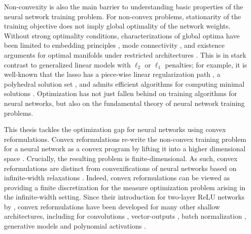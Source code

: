 Non-convexity is also the main barrier to understanding basic properties of the
neural network training problem.
For non-convex problems, stationarity of the training objective does not imply
global optimality of the network weights.
Without strong optimality conditions, characterizations of global optima have
been limited to embedding principles
\citep{fukumizu2000plateau, zhang2021embedding}, mode connectivity
\citep{garipov2018mode, draxler2018barriers}, and existence
arguments for optimal manifolds under restricted architectures
\citep{cooper2021global}.
This is in stark contrast to generalized linear models with \( \ell_2 \)
or \( \ell_1 \) penalties;
for example, it is well-known that the lasso \citep{tibshirani1996regression}
has a piece-wise linear regularization path \citep{osborne2000new, efron2004least},
a polyhedral solution set \citep{tibshirani2013unique}, and
admits efficient algorithms for computing
minimal solutions \citep{tibshirani2013unique}.
Optimization has not just fallen behind on training algorithms for neural
networks, but also on the fundamental theory of neural network training
problems.

This thesis tackles the optimization gap for neural networks using convex
reformulations.
Convex reformulations re-write the non-convex training problem for a neural
network as a convex program by lifting it into a higher dimensional space
\citep{pilanci2020convexnn}.
Crucially, the resulting problem is finite-dimensional.
As such, convex reformulations are distinct from convexifications of neural
networks based on infinite-width relaxations
\citep{bach2017breaking, bengio2006convex}.
Indeed, convex reformulations can be viewed as providing a finite
discretization for the measure optimization problem arising in the
infinite-width setting.
Since their introduction for two-layer ReLU networks by
\citet{pilanci2020convexnn}, convex reformulations have been developed for many
other shallow architectures, including for convolutions
\citep{sahiner2020convex,ergen2021implicit,gupta2021exact}, vector-outputs
\citep{sahiner2021vector}, batch normalization \citep{ergen2021demystifying},
generative models \citep{sahiner2021hidden} and polynomial activations
\citep{bartan2021polynomial}.

